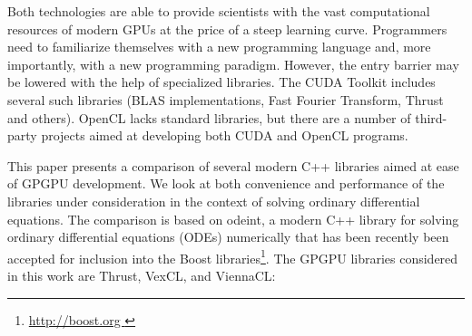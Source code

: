\documentclass[final]{siamltex}
\begin{document}


Both technologies are able to provide scientists with the vast computational
resources of modern GPUs at the price of a steep learning curve.
Programmers need to familiarize
themselves with a new programming language and, more importantly, with a
new programming paradigm. However, the entry barrier may be lowered with the help of
specialized libraries. The CUDA Toolkit includes several such libraries (BLAS
implementations, Fast Fourier Transform, Thrust and others). OpenCL lacks
standard libraries, but there are a number of third-party projects aimed at
developing both CUDA and OpenCL programs.

This paper presents a comparison of several modern C++ libraries aimed
at ease of GPGPU development. We look at both convenience and
performance of the libraries under consideration in the context of
solving ordinary differential equations.  The comparison is based on
odeint, a modern C++ library for solving ordinary differential equations (ODEs) numerically that has been recently
been accepted for inclusion into the Boost libraries\footnote{ \href{ http://boost.org }
  { http://boost.org } }.  The GPGPU libraries considered in this work
are Thrust, VexCL, and ViennaCL:


\end{document}
